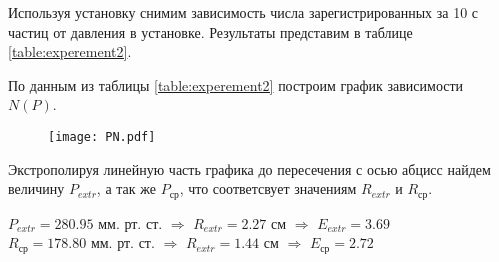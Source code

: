     Используя установку снимим зависимость числа зарегистрированных за 10 с частиц от давления в установке.
    Результаты представим в таблице \ref{table:experement2}.

    

    По данным из таблицы \ref{table:experement2} построим график зависимости $N(P)$.

    \begin{figure}
        \centering
        \texttt{[image: PN.pdf]}
        \caption{}
        \label{fig:plot2}
    \end{figure}

    Экстрополируя линейную часть графика до пересечения с осью абцисс найдем величину $P_{extr}$, а так же
    $P_{\text{ср}}$, что соответсвует значениям $R_{extr}$ и $R_{\text{ср}}$.

    \begin{center}
        $P_{extr} = 280.95$ мм. рт. ст. $\Rightarrow$ $R_{extr} = 2.27$ см $\Rightarrow$ $E_{extr} = 3.69$\\
        $R_{\text{ср}} = 178.80$ мм. рт. ст. $\Rightarrow$ $R_{extr} = 1.44$ см $\Rightarrow$ $E_{\text{ср}}  = 2.72$
    \end{center}
